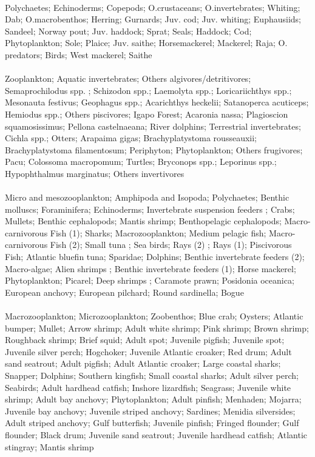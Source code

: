 \fullhline
\hline
{} \\
\hline
Polychaetes; Echinoderms; Copepods; O.crustaceans; O.invertebrates; Whiting; Dab; O.macrobenthos; Herring; Gurnards; Juv. cod; Juv. whiting; Euphausiids; Sandeel; Norway pout; Juv. haddock; Sprat; Seals; Haddock; Cod; Phytoplankton; Sole; Plaice; Juv. saithe; Horsemackerel; Mackerel; Raja; O. predators; Birds; West mackerel; Saithe\\
\fullhline
\hline
{} \\
\hline
Zooplankton; Aquatic invertebrates; Others algivores/detritivores; Semaprochilodus spp. ; Schizodon spp.; Laemolyta spp.; Loricariichthys spp.; Mesonauta festivus; Geophagus spp.; Acarichthys heckelii; Satanoperca acuticeps; Hemiodus spp.; Others piscivores; Igapo Forest; Acaronia nassa; Plagioscion squamosissimus; Pellona castelnaeana; River dolphins; Terrestrial invertebrates; Cichla spp.; Otters; Arapaima gigas; Brachyplatystoma rousseauxii; Brachyplatystoma filamentosum; Periphyton; Phytoplankton; Others frugivores; Pacu; Colossoma macropomum; Turtles; Bryconops spp.; Leporinus spp.; Hypophthalmus marginatus; Others invertivores\\
\fullhline
\hline
{} \\
\hline
Micro and mesozooplankton; Amphipoda and Isopoda; Polychaetes; Benthic molluscs; Foraminifera; Echinoderms; Invertebrate suspension feeders ; Crabs; Mullets; Benthic cephalopods; Mantis shrimp; Benthopelagic cephalopods; Macro-carnivorous Fish (1); Sharks; Macrozooplankton; Medium pelagic fish; Macro-carnivorous Fish (2); Small tuna ; Sea birds; Rays (2) ; Rays (1); Piscivorous Fish; Atlantic bluefin tuna; Sparidae; Dolphins; Benthic invertebrate feeders (2); Macro-algae; Alien shrimps ; Benthic invertebrate feeders (1); Horse mackerel; Phytoplankton; Picarel; Deep shrimps ; Caramote prawn; Posidonia oceanica; European anchovy; European pilchard; Round sardinella; Bogue\\
\fullhline
\hline
{} \\
\hline
Macrozooplankton; Microzooplankton; Zoobenthos; Blue crab; Oysters; Atlantic bumper; Mullet; Arrow shrimp; Adult white shrimp; Pink shrimp; Brown shrimp; Roughback shrimp; Brief squid; Adult spot; Juvenile pigfish; Juvenile spot; Juvenile silver perch; Hogchoker; Juvenile Atlantic croaker; Red drum; Adult sand seatrout; Adult pigfish; Adult Atlantic croaker; Large coastal sharks; Snapper; Dolphins; Southern kingfish; Small coastal sharks; Adult silver perch; Seabirds; Adult hardhead catfish; Inshore lizardfish; Seagrass; Juvenile white shrimp; Adult bay anchovy; Phytoplankton; Adult pinfish; Menhaden; Mojarra; Juvenile bay anchovy; Juvenile striped anchovy; Sardines; Menidia silversides; Adult striped anchovy; Gulf butterfish; Juvenile pinfish; Fringed flounder; Gulf flounder; Black drum; Juvenile sand seatrout; Juvenile hardhead catfish; Atlantic stingray; Mantis shrimp\\
